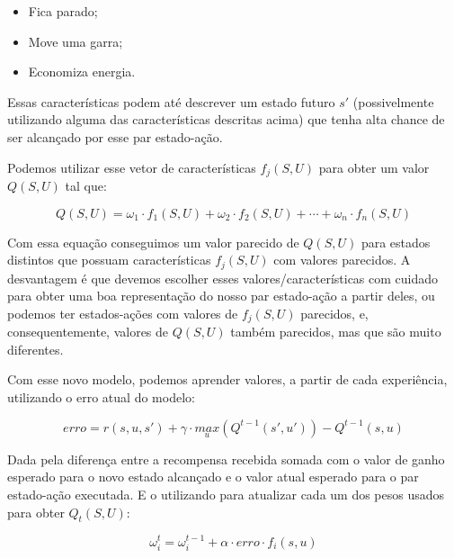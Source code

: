 \begin{itemize}
	\item Fica parado;
	\item Move uma garra;
	\item Economiza energia.
\end{itemize}

Essas características podem até descrever um estado futuro $ s' $ (possivelmente utilizando alguma das características descritas acima) que tenha alta chance de ser alcançado por esse par estado-ação.

Podemos utilizar esse vetor de características $ f_j \left( S, U \right) $ para obter um valor $ Q \left( S, U \right) $ tal que:

\begin{equation} \label{equation:QValueGeneralizado}
	Q \left( S, U \right) = \omega_1 \cdot f_1 \left( S, U \right) + \omega_2 \cdot f_2 \left( S, U \right) + \cdots + \omega_n \cdot f_n \left( S, U \right)
\end{equation}

Com essa equação conseguimos um valor parecido de $ Q \left( S, U \right) $ para estados distintos que possuam características $ f_j \left( S, U \right) $ com valores parecidos. A desvantagem é que devemos escolher esses valores/características com cuidado para obter uma boa representação do nosso par estado-ação a partir deles, ou podemos ter estados-ações com valores de $ f_j \left( S, U \right)$ parecidos, e, consequentemente, valores de $ Q \left( S, U \right) $ também parecidos, mas que são muito diferentes.

Com esse novo modelo, podemos aprender valores, a partir de cada experiência, utilizando o erro atual do modelo:

\begin{equation}
	erro = r \left( s, u, s' \right) + \gamma \cdot \underset{u}{max} \left( Q^{t-1} \left( s', u' \right) \right) - Q^{t-1} \left( s, u \right)
\end{equation}

Dada pela diferença entre a recompensa recebida somada com o valor de ganho esperado para o novo estado alcançado e o valor atual esperado para o par estado-ação executada. E o utilizando para atualizar cada um dos pesos usados para obter $ Q_t \left( S, U \right) $:

\begin{equation}
	\omega_i^t = \omega_i^{t-1} + \alpha \cdot erro \cdot f_i \left( s, u \right)
\end{equation}

